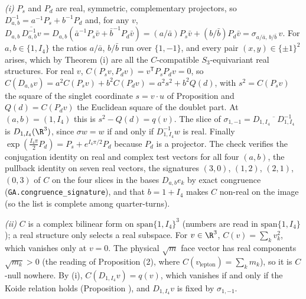 \emph{(i)} $P_{s}$ and $P_{d}$ are real, symmetric, complementary projectors, so $D_{a,b}^{-1} = a^{-1}P_{s} + b^{-1}P_{d}$ and, for any $v$, $D_{a,b}\,\overline{D_{a,b}^{-1}v} = D_{a,b}(\bar{a}^{-1}P_{s}\bar{v} + \bar{b}^{-1}P_{d}\bar{v}) = (a/\bar{a})P_{s}\bar{v} + (b/\bar{b})P_{d}\bar{v} = \sigma_{a/\bar a,\,b/\bar b}\,v$. For $a, b \in \{1, I_4\}$ the ratios $a/\bar{a}$, $b/\bar{b}$ run over $\{1, -1\}$, and every pair $(x, y) \in \{\pm 1\}^{2}$ arises, which by Theorem (i) are all the $C$-compatible $S_{3}$-equivariant real structures. For real $v$, $C(P_{s}v, P_{d}v) = v^{\mathsf{T}}P_{s}P_{d}v = 0$, so $C(D_{a,b}v) = a^{2}C(P_{s}v) + b^{2}C(P_{d}v) = a^{2}s^{2} + b^{2}Q(d)$, with $s^{2} = C(P_{s}v)$ the square of the singlet coordinate $s = v \cdot u$ of Proposition  and $Q(d) = C(P_{d}v)$ the Euclidean square of the doublet part. At $(a, b) = (1, I_4)$ this is $s^{2} - Q(d) = q(v)$. The slice of $\sigma_{1,-1} = D_{1,I_4}\,\overline{\phantom{v}}\,D_{1,I_4}^{-1}$ is $D_{1,I_4}(\R^{3})$, since $\sigma w = w$ if and only if $D_{1,I_4}^{-1}w$ is real. Finally $\exp(\tfrac{I_4\pi}{2}P_{d}) = P_{s} + e^{I_4\pi/2}P_{d}$ because $P_{d}$ is a projector. The check verifies the conjugation identity on real and complex test vectors for all four $(a, b)$, the pullback identity on seven real vectors, the signatures $(3,0)$, $(1,2)$, $(2,1)$, $(0,3)$ of $C$ on the four slices in the bases $D_{a,b}e_{k}$ by exact congruence (\texttt{GA.congruence\_signature}), and that $b = 1 + I_4$ makes $C$ non-real on the image (so the list is complete among quarter-turns).

\emph{(ii)} $C$ is a complex bilinear form on $\mathrm{span}\{1, I_4\}^{3}$ (numbers are read in $\mathrm{span}\{1, I_4\}$); a real structure only selects a real subspace. For $v \in \R^{3}$, $C(v) = \sum_{k}v_{k}^{2}$, which vanishes only at $v = 0$. The physical $\sqrt{m}$ face vector has real components $\sqrt{m_{k}} > 0$ (the reading of Proposition (2), where $C(v_{\mathrm{lepton}}) = \sum_{k}m_{k}$), so it is $C$-null nowhere. By (i), $C(D_{1,I_4}v) = q(v)$, which vanishes if and only if the Koide relation holds (Proposition ), and $D_{1,I_4}v$ is fixed by $\sigma_{1,-1}$.

